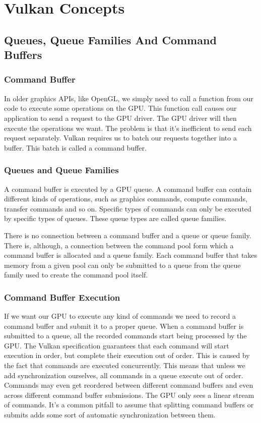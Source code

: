 \chapter{Vulkan Concepts}

\section{Queues, Queue Families And Command Buffers}

\subsection{Command Buffer}

In older graphics APIs, like OpenGL, we simply need to call a function
from our code to execute some operations on the GPU.
This function call causes our application to send a request to the GPU driver.
The GPU driver will then execute the operations we want.
The problem is that it's inefficient to send each request separately.
Vulkan requires us to batch our requests together into a buffer.
This batch is called a command buffer.

\subsection{Queues and Queue Families}

A command buffer is executed by a GPU queue.
A command buffer can contain different kinds of operations, such as graphics
commands, compute commands, transfer commands and so on.
Specific types of commands can only be executed by specific types of queues.
These queue types are called queue families.

There is no connection between a command buffer and a queue or queue family.
There is, although, a connection between the command pool form which a command
buffer is allocated and a queue family.
Each command buffer that takes memory from a given pool can only be submitted
to a queue from the queue family used to create the command pool itself.

\subsection{Command Buffer Execution}

If we want our GPU to execute any kind of commands we need to record a command
buffer and submit it to a proper queue.
When a command buffer is submitted to a queue, all the recorded commands start
being processed by the GPU.
The Vulkan specification guarantees that each command will start execution
in order, but complete their execution out of order.
This is caused by the fact that commands are executed concurrently.
This means that unless we add synchronization ourselves, all commands
in a queue execute out of order.
Commands may even get reordered between different command buffers and even
across different command buffer submissions.
The GPU only sees a linear stream of commands.
It's a common pitfall to assume that splitting command buffers or submits adds
some sort of automatic synchronization between them.

